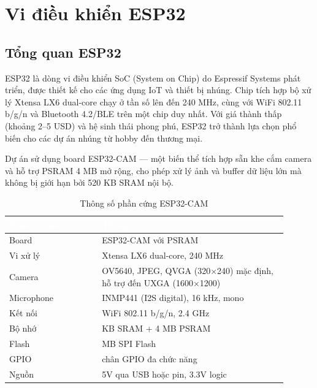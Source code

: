 \section{Vi điều khiển ESP32}

\subsection{Tổng quan ESP32}

ESP32 là dòng vi điều khiển SoC (System on Chip) do Espressif Systems phát triển,
được thiết kế cho các ứng dụng IoT và thiết bị nhúng. Chip tích hợp bộ xử lý
Xtensa LX6 dual-core chạy ở tần số lên đến 240 MHz, cùng với WiFi 802.11 b/g/n
và Bluetooth 4.2/BLE trên một chip duy nhất. Với giá thành thấp (khoảng 2--5 USD)
và hệ sinh thái phong phú, ESP32 trở thành lựa chọn phổ biến cho các dự án
nhúng từ hobby đến thương mại.

Dự án sử dụng board ESP32-CAM --- một biến thể tích hợp sẵn khe cắm camera
và hỗ trợ PSRAM 4 MB mở rộng, cho phép xử lý ảnh và buffer dữ liệu lớn
mà không bị giới hạn bởi 520 KB SRAM nội bộ.

\begin{table}[htbp]
\centering
\caption{Thông số phần cứng ESP32-CAM}
\label{tab:esp32-hardware}
\begin{tabular}{>{\raggedright\arraybackslash}p{0.3\linewidth} >{\raggedright\arraybackslash}p{0.6\linewidth}}
\toprule
\rowcolor{headerblue} \textcolor{white}{\textbf{Thành phần}} & \textcolor{white}{\textbf{Thông số}} \\
\midrule
\rowcolor{rowgray} Board & ESP32-CAM với PSRAM \\
Vi xử lý & Xtensa LX6 dual-core, 240 MHz \\
\rowcolor{rowgray} Camera & OV5640, JPEG, QVGA (320$\times$240) mặc định, hỗ trợ đến UXGA (1600$\times$1200) \\
Microphone & INMP441 (I2S digital), 16 kHz, mono \\
\rowcolor{rowgray} Kết nối & WiFi 802.11 b/g/n, 2.4 GHz \\
Bộ nhớ & 520 KB SRAM + 4 MB PSRAM \\
\rowcolor{rowgray} Flash & 4 MB SPI Flash \\
GPIO & 16 chân GPIO đa chức năng \\
\rowcolor{rowgray} Nguồn & 5V qua USB hoặc pin, 3.3V logic \\
\bottomrule
\end{tabular}
\end{table}

